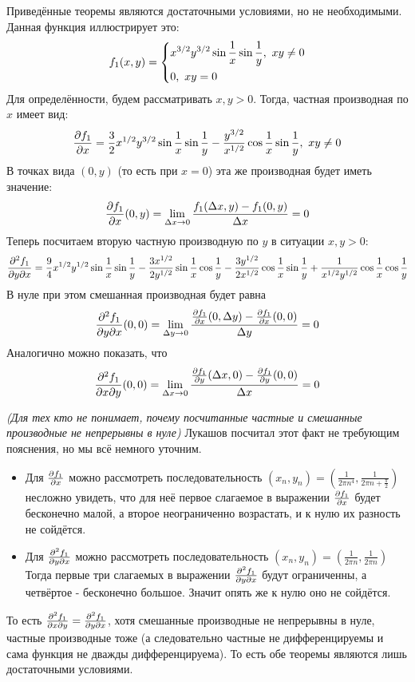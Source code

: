 \begin{example}
	Приведённые теоремы являются достаточными условиями, но не необходимыми. Данная функция иллюстрирует это:
	\[
		f_1(x, y) = \left\{\begin{aligned}
			&{x^{3/2} y^{3/2} \sin \frac{1}{x} \sin \frac{1}{y},\ xy \neq 0}
			\\
			&{0,\ xy = 0}
		\end{aligned}\right.
	\]
	Для определённости, будем рассматривать $x, y > 0$. Тогда, частная производная по $x$ имеет вид:
	\[
		\frac{\partial f_1}{\partial x} = \frac{3}{2} x^{1/2} y^{3/2} \sin \frac{1}{x} \sin \frac{1}{y} - \frac{y^{3/2}}{x^{1/2}} \cos \frac{1}{x} \sin \frac{1}{y},\ xy \neq 0
	\]
	В точках вида $(0, y)$ (то есть при $x = 0$) эта же производная будет иметь значение:
	\[
		\frac{\partial f_1}{\partial x} (0, y) = \lim\limits_{\Delta x \to 0} \frac{f_1(\Delta x, y) - f_1(0, y)}{\Delta x} = 0
	\]
	Теперь посчитаем вторую частную производную по $y$ в ситуации $x, y > 0$:
	\[
		\frac{\partial^2 f_1}{\partial y \partial x} = \frac{9}{4} x^{1/2} y^{1/2} \sin \frac{1}{x} \sin \frac{1}{y} - \frac{3x^{1/2}}{2y^{1/2}} \sin \frac{1}{x} \cos \frac{1}{y} - \frac{3y^{1/2}}{2x^{1/2}} \cos \frac{1}{x} \sin \frac{1}{y} + \frac{1}{x^{1/2} y^{1/2}} \cos \frac{1}{x} \cos \frac{1}{y} 
	\]
	В нуле при этом смешанная производная будет равна
	\[
		\frac{\partial^2 f_1}{\partial y \partial x}(0, 0) = \lim\limits_{\Delta y \to 0}\frac{\frac{\partial f_1}{\partial x}(0, \Delta y) - \frac{\partial f_1}{\partial x}(0, 0)}{\Delta y} = 0
	\]
	Аналогично можно показать, что 
	\[
		\frac{\partial^2 f_1}{\partial x \partial y}(0, 0) = \lim\limits_{\Delta x \to 0}\frac{\frac{\partial f_1}{\partial y}(\Delta x, 0) - \frac{\partial f_1}{\partial y}(0, 0)}{\Delta x} = 0
	\]
	\begin{anote}
		\textit{(Для тех кто не понимает, почему посчитанные частные и смешанные производные не непрерывны в нуле)} Лукашов посчитал этот факт не требующим пояснения, но мы всё немного уточним.  
		\begin{itemize}
			\item Для $\frac{\partial f_1}{\partial x}$ можно рассмотреть последовательность $(x_n,y_n) = (\frac{1}{2\pi n^4},\frac{1}{2\pi n + \frac{\pi}{2}})$ несложно увидеть, что для неё первое слагаемое в выражении $\frac{\partial f_1}{\partial x}$ будет бесконечно малой, а второе неограниченно возрастать, и к нулю их разность не сойдётся.
			\item Для $
			\frac{\partial^2 f_1}{\partial y \partial x}$ можно рассмотреть последовательность $(x_n, y_n) = (\frac{1}{2\pi n}, \frac{1}{2\pi n})$ Тогда первые три слагаемых в выражении $
			\frac{\partial^2 f_1}{\partial y \partial x}$ будут ограниченны, а четвёртое - бесконечно большое. Значит опять же к нулю оно не сойдётся.
		\end{itemize}
	\end{anote}
	
	То есть $\frac{\partial^2 f_1}{\partial x \partial y} = \frac{\partial^2 f_1}{\partial y \partial x}$, хотя смешанные производные не непрерывны в нуле, частные производные тоже (а следовательно частные не дифференцируемы и сама функция не дважды дифференцируема). То есть обе теоремы являются лишь достаточными условиями.
\end{example}

